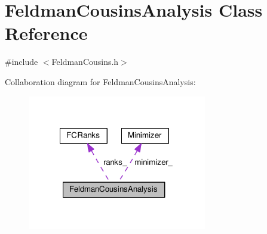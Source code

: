 \hypertarget{classFeldmanCousinsAnalysis}{\section{Feldman\-Cousins\-Analysis Class Reference}
\label{classFeldmanCousinsAnalysis}
}


{\ttfamily \#include $<$Feldman\-Cousins.\-h$>$}



Collaboration diagram for Feldman\-Cousins\-Analysis\-:
\nopagebreak
\begin{figure}[H]
\begin{center}
\leavevmode
\includegraphics[width=221pt]{classFeldmanCousinsAnalysis__coll__graph}
\end{center}
\end{figure}
